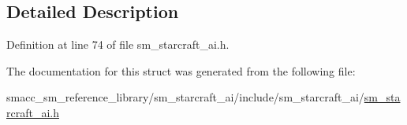 \subsection{Detailed Description}


Definition at line 74 of file sm\+\_\+starcraft\+\_\+ai.\+h.



The documentation for this struct was generated from the following file\+:\begin{DoxyCompactItemize}
\item 
smacc\+\_\+sm\+\_\+reference\+\_\+library/sm\+\_\+starcraft\+\_\+ai/include/sm\+\_\+starcraft\+\_\+ai/\hyperlink{sm__starcraft__ai_8h}{sm\+\_\+starcraft\+\_\+ai.\+h}\end{DoxyCompactItemize}
